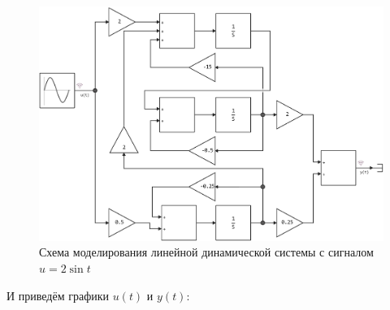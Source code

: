 \documentclass[a4paper]{article}
\begin{document}
\begin{figure}[H]
    \centering
    \includegraphics[height=0.27\textheight]{sources/task2_2sint_model.png}
    \caption*{Схема моделирования линейной динамической системы с сигналом $u=2\sin{t}$}
\end{figure}
И приведём графики $u(t)$ и $y(t)$:
\end{document}
